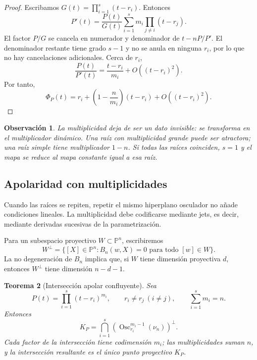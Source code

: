 \documentclass[11pt,oneside]{scrartcl}
\theoremstyle{plainblue}
\newtheorem{theorem}{Teorema}[section]
\theoremstyle{definitionblue}
\theoremstyle{remarkgray}
\newtheorem{remark}[theorem]{Observación}
\newcommand{\PP}{\mathbb{P}}
\newcommand{\Osc}{\operatorname{Osc}}
\begin{document}
\begin{proof}
Escribamos \(G(t)=\prod_{i=1}^{s}(t-r_i)\). Entonces
\[
P'(t)=\frac{P(t)}{G(t)}
\sum_{i=1}^{s}m_i\prod_{j\ne i}(t-r_j).
\]
El factor \(P/G\) se cancela en numerador y denominador de \(t-nP/P'\). El
denominador restante tiene grado \(s-1\) y no se anula en ninguna \(r_i\), por lo
que no hay cancelaciones adicionales. Cerca de \(r_i\),
\[
\frac{P(t)}{P'(t)}=\frac{t-r_i}{m_i}+O((t-r_i)^2).
\]
Por tanto,
\[
\Phi_P(t)=r_i+\left(1-\frac{n}{m_i}\right)(t-r_i)+O((t-r_i)^2).
\]
\end{proof}

\begin{remark}
La multiplicidad deja de ser un dato invisible: se transforma en el multiplicador
dinámico. Una raíz con multiplicidad grande puede ser atractora; una raíz simple
tiene multiplicador \(1-n\). Si todas las raíces coinciden, \(s=1\) y el mapa se
reduce al mapa constante igual a esa raíz.
\end{remark}

\subsection{Apolaridad con multiplicidades}

Cuando las raíces se repiten, repetir el mismo hiperplano osculador no añade
condiciones lineales. La multiplicidad debe codificarse mediante jets, es decir,
mediante derivadas sucesivas de la parametrización.

Para un subespacio proyectivo \(W\subset\PP^n\), escribiremos
\[
W^\perp=\{[X]\in\PP^n:B_n(w,X)=0\text{ para todo }[w]\in W\}.
\]
La no degeneración de \(B_n\) implica que, si \(W\) tiene dimensión proyectiva
\(d\), entonces \(W^\perp\) tiene dimensión \(n-d-1\).

\begin{theorem}[Intersección apolar confluyente]\label{thm:confluent-apolar}
Sea
\[
P(t)=\prod_{i=1}^{s}(t-r_i)^{m_i},
\qquad r_i\ne r_j\ (i\ne j),
\qquad \sum_{i=1}^{s}m_i=n.
\]
Entonces
\begin{equation}\label{eq:confluent-intersection}
\boxed{
K_P=\bigcap_{i=1}^{s}
\left(\Osc_{r_i}^{m_i-1}(\nu_n)\right)^\perp.}
\end{equation}
Cada factor de la intersección tiene codimensión \(m_i\); las multiplicidades suman
\(n\), y la intersección resultante es el único punto proyectivo \(K_P\).
\end{theorem}
\end{document}
